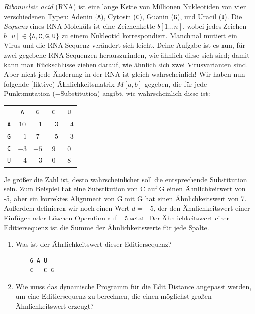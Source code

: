 \documentclass{uebung_cs}
\begin{document}
\begin{aufgabe}[RNA]
    \emph{Ribonucleic acid} (RNA) ist eine lange Kette von Millionen Nukleotiden von vier verschiedenen Typen:
    Adenin (\verb|A|), Cytosin (\verb|C|), Guanin (\verb|G|), und Uracil (\verb|U|). Die \emph{Sequenz} eines RNA-Moleküls ist eine Zeichenkette $b[1\dots n]$, wobei jedes Zeichen $b[u]\in\{\texttt{A}, \texttt{C}, \texttt{G}, \texttt{U}\}$ zu einem Nukleotid korrespondiert.
        Manchmal mutiert ein Virus und die RNA-Sequenz verändert sich leicht. Deine Aufgabe ist es nun, für zwei gegebene RNA-Sequenzen herauszufinden, wie ähnlich diese sich sind; damit kann man Rückschlüsse ziehen darauf, wie ähnlich sich zwei Virusvarianten sind. Aber nicht jede Änderung in der RNA ist gleich wahrscheinlich! Wir haben nun folgende (fiktive) Ähnlichkeitsmatrix $M[a,b]$ gegeben, die für jede Punktmutation (=Substitution) angibt, wie wahrscheinlich diese ist:

        \begin{tabular}{ccccc}
                      & \texttt{A}  & \texttt{G}  & \texttt{C} & \texttt{U}\\
           \texttt{A} & $10$ & $-1$ & $-3$ & $-4$\\
           \texttt{G} & $-1$ & $ 7$ & $-5$ & $-3$\\
           \texttt{C} & $-3$ & $-5$ & $ 9$ & $ 0$\\
           \texttt{U} & $-4$ & $-3$ & $ 0$ & $ 8$\\
        \end{tabular}

        Je größer die Zahl ist, desto wahrscheinlicher soll die entsprechende Substitution sein.
        Zum Beispiel hat eine Substitution von C auf G einen Ähnlichkeitwert von -5, aber ein korrektes Alignment von G mit G hat einen Ähnlichkeitswert von 7.
        Außerdem definieren wir noch einen Wert $d=-5$, der den Ähnlichkeitswert einer Einfügen oder Löschen Operation auf $-5$ setzt.
        Der Ähnlichkeitswert einer Editiersequenz ist die Summe der Ähnlichkeitswerte für jede Spalte.
        \begin{enumerate}
            \item\bestehen Was ist der Ähnlichkeitswert dieser Editiersequenz?
\begin{verbatim}
    G A U  
    C   C G
\end{verbatim}
            \item\mittel Wie muss das dynamische Programm für die Edit Distance angepasst werden, um eine Editiersequenz zu berechnen, die einen möglichst großen Ähnlichkeitswert erzeugt?
        \end{enumerate}
\end{aufgabe}
\end{document}
